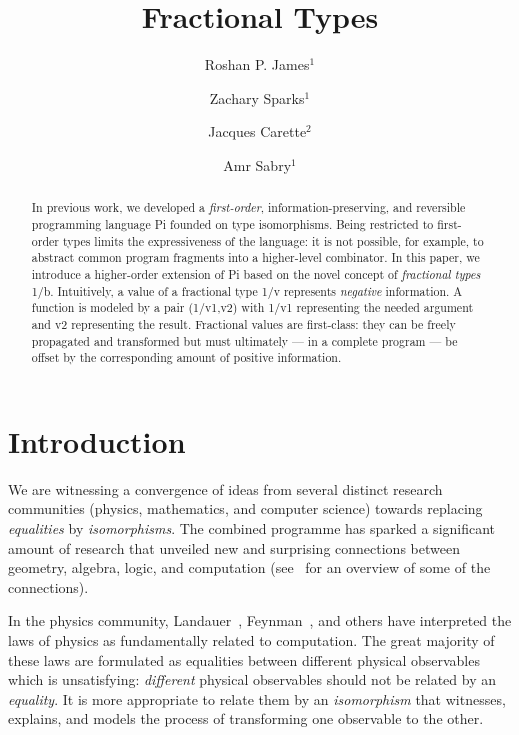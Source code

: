 \documentclass{llncs}
\begin{document}
\title{Fractional Types}
\author{Roshan P. James$^{1}$ \and Zachary Sparks$^{1}$ \and Jacques Carette$^{2}$ \and Amr Sabry$^{1}$}
\maketitle

\begin{abstract}
  In previous work, we developed a \emph{first-order},
  information-preserving, and reversible programming language {{Pi}} founded
  on type isomorphisms. Being restricted to first-order types limits the
  expressiveness of the language: it is not possible, for example, to
  abstract common program fragments into a higher-level combinator. In this
  paper, we introduce a higher-order extension of {{Pi}} based on the novel
  concept of \emph{fractional types} {{1/b}}. Intuitively, a value of a
  fractional type {{1/v}} represents \emph{negative} information. A
  function is modeled by a pair {{(1/v1,v2)}} with {{1/v1}}
  representing the needed argument and {{v2}} representing the
  result. Fractional values are first-class: they can be freely propagated
  and transformed but must ultimately --- in a complete program --- be offset
  by the corresponding amount of positive information.
\end{abstract}

\section{Introduction} 

We are witnessing a convergence of ideas from several distinct research
communities (physics, mathematics, and computer science) towards replacing
\emph{equalities} by \emph{isomorphisms}. The combined programme has sparked
a significant amount of research that unveiled new and surprising connections
between geometry, algebra, logic, and computation (see~\cite{baez2011physics}
for an overview of some of the connections).

In the physics community, Landauer~\cite{Landauer:1961,Landauer},
Feynman~\cite{springerlink:10.1007/BF02650179}, and others have interpreted
the laws of physics as fundamentally related to computation. The great
majority of these laws are formulated as equalities between different
physical observables which is unsatisfying: \emph{different} physical
observables should not be related by an \emph{equality}. It is more
appropriate to relate them by an \emph{isomorphism} that witnesses, explains,
and models the process of transforming one observable to the other.
\end{document}
